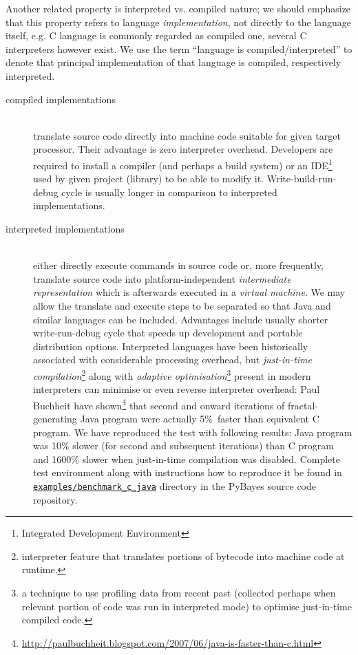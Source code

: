Another related property is interpreted vs. compiled nature; we should emphasize that this property
refers to language \emph{implementation}, not directly to the language itself, e.g. C language
is commonly regarded as compiled one, several C interpreters however exist. We use the term
``language is compiled/interpreted'' to denote that principal implementation of that language is
compiled, respectively interpreted.
\begin{description}
	\item[compiled implementations] \hfill \\
		translate source code directly into machine code suitable for given target processor. Their
		advantage is zero interpreter overhead. Developers are required to install a
		compiler (and perhaps a build system) or an IDE\footnote{Integrated Development Environment}
		used by given project (library) to be able to modify it. Write-build-run-debug cycle is
		usually longer in comparison to interpreted implementations.
	\item[interpreted implementations] \hfill \\
		either directly execute commands in source code or, more frequently, translate source code
		into platform-independent \emph{intermediate representation} which is afterwards executed in
		a \emph{virtual machine}. We may allow the translate and execute steps to be separated so that
		Java and similar languages can be included. Advantages include usually shorter
		write-run-debug cycle that speeds up development and portable distribution options.
		Interpreted languages have been historically associated with considerable processing
		overhead, but \emph{just-in-time compilation}\footnote{interpreter feature that translates
		portions of bytecode into machine code at runtime.} along with \emph{adaptive
		optimisation}\footnote{a technique to use profiling data from recent past (collected perhaps
		when relevant portion of code was run in interpreted mode) to optimise just-in-time compiled
		code.} present in modern interpreters can minimise or even reverse interpreter
		overhead: Paul Buchheit have shown\footnote{\url{http://paulbuchheit.blogspot.com/2007/06/java-is-faster-than-c.html}}
		that second and onward iterations of fractal-generating Java program were actually
		5\%~faster than equivalent C program. We have reproduced the test with following results:
		Java program was 10\% slower (for second and subsequent iterations) than C program and 1600\%
		slower when just-in-time compilation was disabled. Complete test environment along with
		instructions how to reproduce it be found in
		\href{http://github.com/strohel/PyBayes/tree/master/examples/benchmark_c_java}{\nolinkurl{examples/benchmark_c_java}}
		directory in the PyBayes source code repository.
\end{description}
